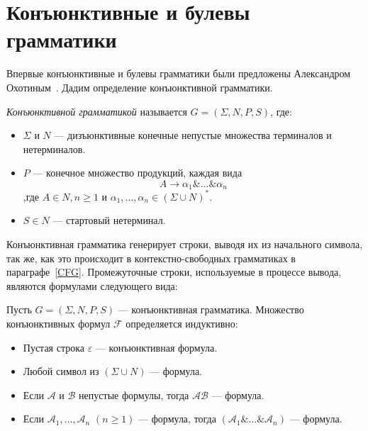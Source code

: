\chapter{Конъюнктивные и булевы грамматики}

Впервые конъюнктивные и булевы грамматики были предложены Александром Охотиным~\cite{DBLP:journals/jalc/Okhotin01,Okhotin:2003:BG:1758089.1758123}. Дадим определение конъюнктивной грамматики.

\begin{definition}
    \textit{Конъюнктивной грамматикой} называется $G = (\Sigma,N,P,S)$, где:
    \begin{itemize}
        \item $\Sigma$ и $N$ --- дизъюнктивные конечные непустые множества терминалов и нетерминалов.
        \item $P$ --- конечное множество продукций, каждая вида
        \[
        A\rightarrow \alpha_1\&...\&\alpha_n
        \]
        ,где $A \in N,n \geq 1$ и $\alpha_1,...,\alpha_n \in (\Sigma \cup N)^*$.
        \item $S \in N$  --- стартовый нетерминал.
    \end{itemize}
\end{definition}

Конъюнктивная грамматика генерирует строки, выводя их из начального символа, так же, как это происходит в контекстно-свободных грамматиках в параграфе~\ref{CFG}. Промежуточные строки, используемые в процессе вывода, являются формулами следующего вида:

\begin{definition}\label{Definition of conjunctive formula}
    Пусть $G = (\Sigma,N,P,S)$ --- конъюнктивная грамматика. Множество конъюнктивных формул $ \mathcal{F}$ определяется индуктивно:
    \begin{itemize}
        \item Пустая строка $\varepsilon$ --- конъюнктивная формула. 
        \item Любой символ из $(\Sigma \cup N)$ --- формула.
        \item Если $\mathcal{A}$ и $\mathcal{B}$ непустые формулы, тогда $\mathcal{AB}$ --- формула.
        \item Если $\mathcal{A}_1,\ldots,\mathcal{A}_n$ $(n \geqslant 1)$ --- формула, тогда $(\mathcal{A}_1\&\ldots\&\mathcal{A}_n)$ --- формула.
    \end{itemize}
\end{definition}

